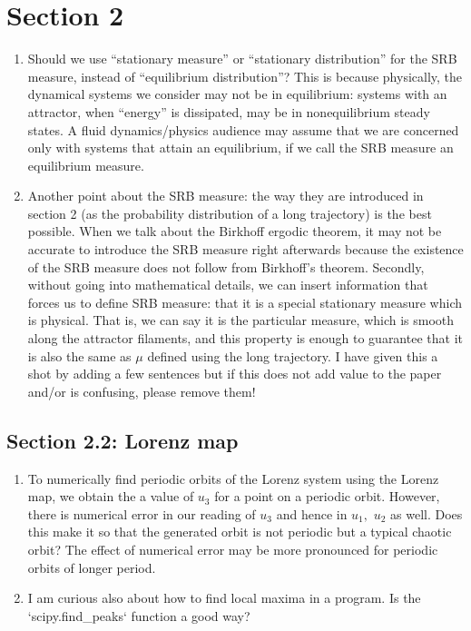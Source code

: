 \documentclass[12pt]{article}
\begin{document}
\section*{Section 2}
\begin{enumerate}
    \item Should we use ``stationary measure'' or ``stationary distribution'' for the SRB measure, instead of ``equilibrium distribution''? This is because physically, the dynamical systems we consider may not be in equilibrium: systems with an attractor, when ``energy'' is dissipated, may be in nonequilibrium steady states. A fluid dynamics/physics audience may assume that we are concerned only with systems that attain an equilibrium, if we call the SRB measure 
    an equilibrium measure.
    \item Another point about the SRB measure: the way they are introduced in section 2 (as the probability distribution of a long trajectory) is the best possible. When we talk about the Birkhoff ergodic theorem, it may not be accurate to introduce the SRB measure right afterwards because the existence of the SRB measure does not follow from Birkhoff's theorem. Secondly, without going into mathematical details, we can insert information that forces us to define SRB measure: that it is a special stationary measure which is physical. That is, we can say it is the particular measure, which is smooth along the attractor filaments, and this property is enough to guarantee that it is also the same as $\mu$ defined using the long trajectory. I have given this a shot by adding a few sentences but if this does not add value to the paper and/or is confusing, please remove them!
\end{enumerate}
\subsection*{Section 2.2: Lorenz map}
\begin{enumerate}
    \item To numerically find periodic orbits of the Lorenz system using the Lorenz map, we obtain the a value of $u_3$ for a point on a periodic orbit. However, there is numerical error in our reading of $u_3$ and hence in $u_1,$ $u_2$ as well. Does this make it so that the generated orbit is not periodic but a typical chaotic orbit? The effect of numerical error may be more pronounced for periodic orbits of longer period.  
    \item I am curious also about how to find local maxima in a program. Is the `scipy.find\_peaks` function a good way?
\end{enumerate} 
\end{document}
